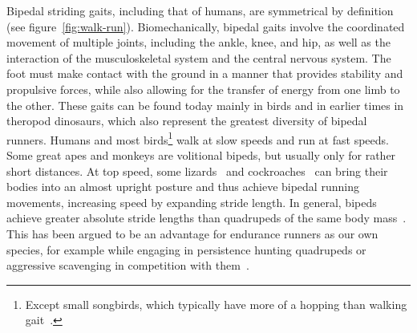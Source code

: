     Bipedal striding gaits, including that of humans, are symmetrical by definition (see figure~\ref{fig:walk-run}). Biomechanically, bipedal gaits involve the coordinated movement of multiple joints, including the ankle, knee, and hip, as well as the interaction of the musculoskeletal system and the central nervous system. The foot must make contact with the ground in a manner that provides stability and propulsive forces, while also allowing for the transfer of energy from one limb to the other. These gaits can be found today mainly in birds and in earlier times in theropod dinosaurs, which also represent the greatest diversity of bipedal runners. Humans and most birds\footnote{Except small songbirds, which typically have more of a hopping than walking gait~\cite{Lee2018}.} walk at slow speeds and run at fast speeds.~\cite{Lee2018} Some great apes and monkeys are volitional bipeds, but usually only for rather short distances. At top speed, some lizards~\cite{Irschick1999} and cockroaches~\cite{Full1991} can bring their bodies into an almost upright posture and thus achieve bipedal running movements, increasing speed by expanding stride length. In general, bipeds achieve greater absolute stride lengths than quadrupeds of the same body mass~\cite{Reynolds1987}. This has been argued to be an advantage for endurance runners as our own species, for example while engaging in persistence hunting quadrupeds or aggressive scavenging in competition with them~\cite{Carrier1984}.
    